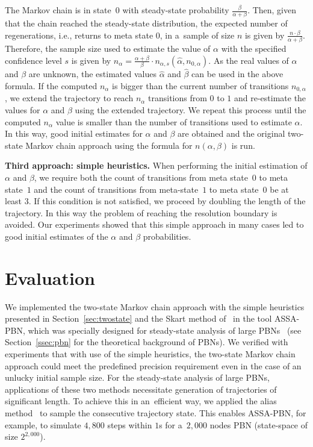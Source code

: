 \documentclass[runningheads,a4paper]{llncs}
\begin{document}
The Markov chain is in state~$0$ with steady-state probability $\frac{\beta}{\alpha+\beta}$. Then,
given that the chain reached the steady-state distribution, the expected number of regenerations,
i.e., returns to meta state 0, in a~sample of size $n$ is given by
$\frac{n\cdot\beta}{\alpha+\beta}$. Therefore, the sample size used to estimate the value of
$\alpha$ with the specified confidence level $s$ is given by 
$n_{\alpha}=\frac{\alpha+\beta}{\beta}\cdot n_{\alpha,s}(\hat{\alpha},n_{0,\alpha})$. As the real
values of $\alpha$ and $\beta$ are unknown, the estimated values $\hat{\alpha}$ and $\hat{\beta}$
can be used in the above formula. If the computed $n_{\alpha}$ is bigger than the current number
of transitions $n_{0,\alpha}$, we extend the trajectory to reach $n_{\alpha}$ transitions from $0$
to $1$ and re-estimate the values for $\alpha$ and $\beta$ using the extended trajectory. We
repeat this process until the computed $n_{\alpha}$ value is smaller than the number of
transitions used to estimate $\alpha$. In this way, good initial estimates for $\alpha$ and
$\beta$ are obtained and the original two-state Markov chain approach using the formula for
$n(\alpha,\beta)$ is run.



\medskip
\noindent
{\bf Third approach: simple heuristics.}
When performing the initial estimation of $\alpha$ and $\beta$, we require both the count of
transitions from meta state~$0$ to meta state~$1$ and the count of transitions from meta-state~$1$
to meta state~$0$ be at least $3$. If this condition is not satisfied, we proceed by doubling the
length of the trajectory. In this way the problem of reaching the resolution boundary is
avoided. Our experiments showed that this simple approach in many cases led to good initial
estimates of the $\alpha$ and $\beta$ probabilities.

\section{Evaluation}
\label{sec:evaluation}
We implemented the two-state Markov chain approach with the simple heuristics presented in
Section~\ref{sec:twostate} and the Skart method of~\cite{TWLS08} in the tool {\sf ASSA-PBN},
which was specially designed for steady-state analysis of large PBNs~\cite{assa}
(see Section~\ref{ssec:pbn} for the theoretical background of PBNs).
We verified with experiments that with use of the simple heuristics,
the two-state Markov chain approach could meet the predefined precision requirement
even in the case of an unlucky initial sample size.
For the steady-state analysis of large PBNs, applications of these two
methods necessitate generation of trajectories of significant length. To achieve this in
an~efficient way, we applied the alias method~\cite{WAJ77} to sample the consecutive trajectory
state. This enables {\sf ASSA-PBN}, for example, to simulate $4,800$ steps within $1$s for
a~$2,000$ nodes PBN (state-space of size $2^{2,000}$).
\end{document}
